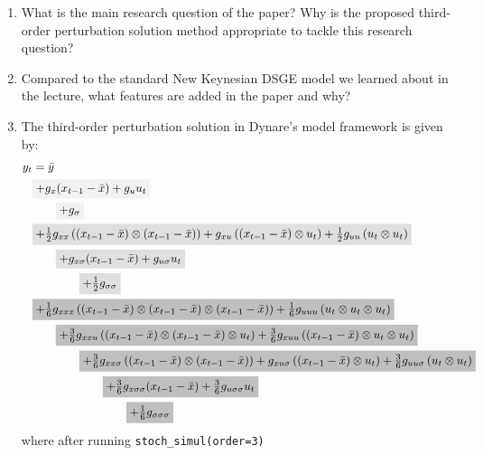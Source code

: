 \documentclass{article}
\begin{document}
\begin{enumerate}
\item
What is the main research question of the paper?
Why is the proposed third-order perturbation solution method appropriate to tackle this research question?

\item
Compared to the standard New Keynesian DSGE model we learned about in the lecture,
  what features are added in the paper and why?

\item
The third-order perturbation solution in Dynare's model framework is given by:
\begin{align*}
y_t &= \bar{y}\\
&
\colorbox{gray!10}{\(%
  +g_x (x_{t-1} - \bar{x}) + g_u u_{t}
\)}
\\
&
\qquad
\colorbox{gray!10}{\(%
  + g_{\sigma}
\)}
\\
&
\colorbox{gray!25}{\(%
  + \frac{1}{2} g_{xx} \left((x_{t-1} - \bar{x}) \otimes (x_{t-1} - \bar{x})\right)
  +             g_{xu} \left((x_{t-1} - \bar{x}) \otimes u_t\right)
  + \frac{1}{2} g_{uu} \left(u_t \otimes u_t\right)
\)}
\\
&
\qquad
\colorbox{gray!25}{\(%
  + g_{x\sigma} (x_{t-1} - \bar{x})
  + g_{u\sigma} u_t
\)}
\\
&
\qquad\qquad
\colorbox{gray!25}{\(%
  + \frac{1}{2} g_{\sigma\sigma}
\)}
\\
&
\colorbox{gray!50}{\(%
  + \frac{1}{6} g_{xxx} \left((x_{t-1} - \bar{x}) \otimes (x_{t-1} - \bar{x}) \otimes (x_{t-1} - \bar{x})\right)
  + \frac{1}{6} g_{uuu} \left(u_t \otimes u_t \otimes u_t\right)
\)}
\\
&
\qquad
\colorbox{gray!50}{\(%
  + \frac{3}{6} g_{xxu} \left((x_{t-1} - \bar{x}) \otimes (x_{t-1} - \bar{x}) \otimes u_t \right)
  + \frac{3}{6} g_{xuu} \left((x_{t-1} - \bar{x}) \otimes u_t \otimes u_t \right)
\)}
\\
&
\qquad\qquad
\colorbox{gray!50}{\(%
  + \frac{3}{6} g_{xx\sigma} \left((x_{t-1} - \bar{x}) \otimes (x_{t-1} - \bar{x}) \right)
  +             g_{xu\sigma} \left((x_{t-1} - \bar{x}) \otimes u_t \right)
  + \frac{3}{6} g_{uu\sigma} \left(u_t \otimes u_t \right)
\)}
\\
&
\qquad\qquad\qquad
\colorbox{gray!50}{\(%
  + \frac{3}{6} g_{x\sigma\sigma} (x_{t-1} - \bar{x})
  + \frac{3}{6} g_{u\sigma\sigma} u_t
\)}
\\
&
\qquad\qquad\qquad\qquad
\colorbox{gray!50}{\(
+ \frac{1}{6} g_{\sigma\sigma\sigma}
\)}
\end{align*}
where after running \texttt{stoch\_simul{(order=3)}}


\end{enumerate}
\end{document}
